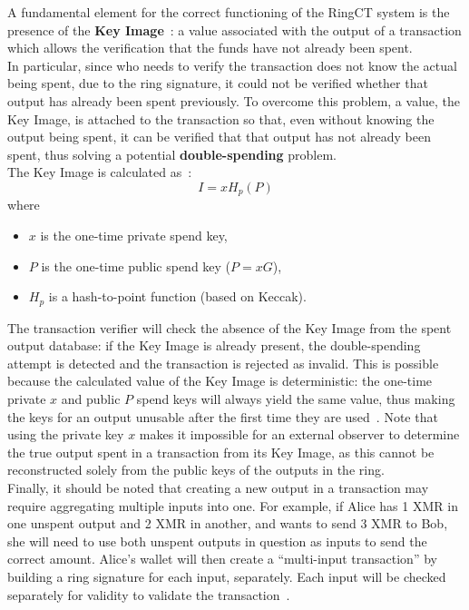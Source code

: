 \documentclass[conference]{IEEEtran}
\begin{document}
A fundamental element for the correct functioning of the RingCT system is the presence of the \textbf{Key Image}~\cite{key_image}: a value associated with the output of a transaction which allows the verification that the funds have not already been spent.\\
In particular, since who needs to verify the transaction does not know the actual being spent, due to the ring signature, it could not be verified whether that output has already been spent previously. To overcome this problem, a value, the Key Image, is attached to the transaction so that, even without knowing the output being spent, it can be verified that that output has not already been spent, thus solving a potential \textbf{double-spending} problem.\\
The Key Image is calculated as~\cite{zero_to_monero_2, key_image}:
\[
I = xH_p(P)
\]
where
\begin{itemize}
\item $x$ is the one-time private spend key,
\item $P$ is the one-time public spend key ($P = xG$),
\item $H_p$ is a hash-to-point function (based on Keccak).
\end{itemize}
The transaction verifier will check the absence of the Key Image from the spent output database: if the Key Image is already present, the double-spending attempt is detected and the transaction is rejected as invalid. This is possible because the calculated value of the Key Image is deterministic: the one-time private $x$ and public $P$ spend keys will always yield the same value, thus making the keys for an output unusable after the first time they are used~\cite{zero_to_monero_2}. Note that using the private key $x$ makes it impossible for an external observer to determine the true output spent in a transaction from its Key Image, as this cannot be reconstructed solely from the public keys of the outputs in the ring.\\

Finally, it should be noted that creating a new output in a transaction may require aggregating multiple inputs into one. For example, if Alice has 1 XMR in one unspent output and 2 XMR in another, and wants to send 3 XMR to Bob, she will need to use both unspent outputs in question as inputs to send the correct amount. Alice's wallet will then create a ``multi-input transaction'' by building a ring signature for each input, separately. Each input will be checked separately for validity to validate the transaction~\cite{ringct, zero_to_monero_2, mastering_monero}.
\end{document}
